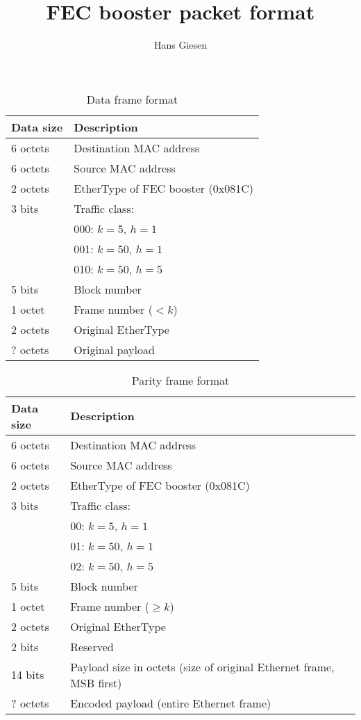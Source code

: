 \documentclass{article}
\begin{document}
  \title{FEC booster packet format}

  \author{Hans Giesen}

  \maketitle  

  \begin{table}
    \begin{tabular}{l l}
      \toprule
        Data size & Description \\
      \midrule
        6 octets & Destination MAC address \\
        6 octets & Source MAC address \\
        2 octets & EtherType of FEC booster (0x081C) \\
        3 bits & Traffic class: \\
               & 000: $k = 5$, $h = 1$ \\
               & 001: $k = 50$, $h = 1$ \\
               & 010: $k = 50$, $h = 5$ \\
        5 bits & Block number \\
        1 octet & Frame number ($< k$) \\
        2 octets & Original EtherType \\
        ? octets & Original payload \\
      \bottomrule
    \end{tabular}
    \caption{Data frame format}
  \end{table}

  \begin{table}
    \begin{tabular}{l l}
      \toprule
        Data size & Description \\
      \midrule
        6 octets & Destination MAC address \\
        6 octets & Source MAC address \\
        2 octets & EtherType of FEC booster (0x081C) \\
        3 bits & Traffic class: \\
               & 00: $k = 5$, $h = 1$ \\
               & 01: $k = 50$, $h = 1$ \\
               & 02: $k = 50$, $h = 5$ \\
        5 bits & Block number \\
        1 octet & Frame number ($\ge k$) \\
        2 octets & Original EtherType \\
	2 bits & Reserved \\
        14 bits & Payload size in octets (size of original Ethernet frame, MSB first) \\
        ? octets & Encoded payload (entire Ethernet frame) \\
      \bottomrule
    \end{tabular}
    \caption{Parity frame format}
  \end{table}
\end{document}
